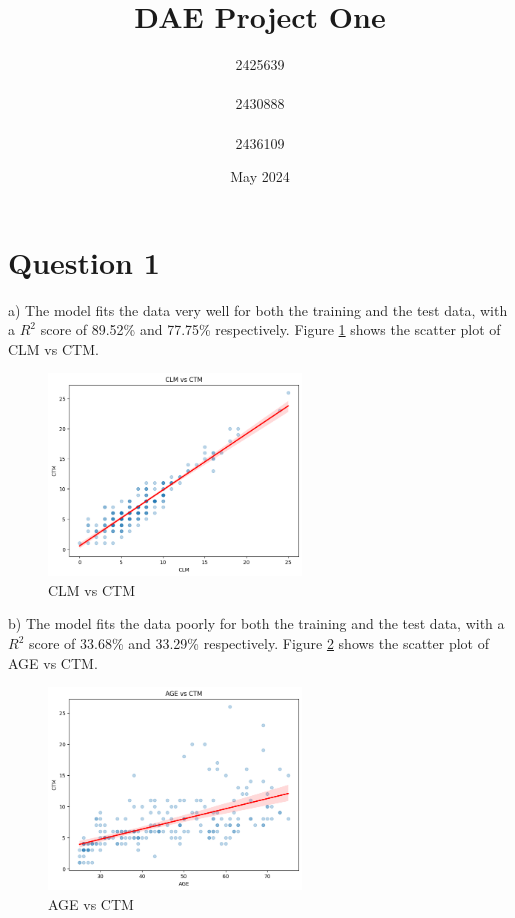 \documentclass{article}
\title{DAE Project One}
\author{
2425639
\\\\
2430888
\\\\
2436109
}
\date{May 2024}
\begin{document}
\maketitle

\section*{Question 1}

a)  The model fits the data very well for both the training and the test data, with a $R^2$ score of 89.52\%  and 77.75\%  respectively. Figure \ref{CLMCTM} shows the scatter plot of CLM vs CTM.

\begin{figure}[H]
\centering
\includegraphics[width=0.6\textwidth]{CLM.png}
\caption{CLM vs CTM}
\label{CLMCTM}
\end{figure}
\noindent b)  The model fits the data poorly for both the training and the test data, with a $R^2$ score of 33.68\%  and 33.29\% respectively. Figure \ref{AGECTM} shows the scatter plot of AGE vs CTM.

\begin{figure}[H]
\centering
\includegraphics[width=0.6\textwidth]{AGE.png}
\caption{AGE vs CTM}
\label{AGECTM}
\end{figure}
\end{document}
